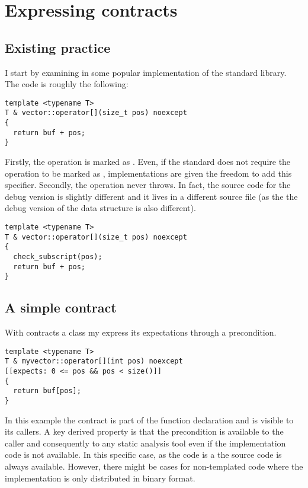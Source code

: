 \section{Expressing contracts}

\subsection{Existing practice}

I start by examining \cppid{[]} in some popular
implementation of the standard library. The code is roughly the following:

\begin{lstlisting}
template <typename T>
T & vector::operator[](size_t pos) noexcept
{
  return buf + pos;
}
\end{lstlisting}

Firstly, the operation is marked as . Even, if the standard
does not require the operation to be marked as ,
implementations are given the freedom to add this specifier. Secondly, the
operation never throws. In fact, the source code for the debug version is
slightly different and it lives in a different source file (as the the debug
version of the data structure is also different).

\begin{lstlisting}
template <typename T>
T & vector::operator[](size_t pos) noexcept
{
  check_subscript(pos);
  return buf + pos;
}
\end{lstlisting}

\subsection{A simple contract}

With contracts a class my express its expectations through a precondition.

\begin{lstlisting}
template <typename T>
T & myvector::operator[](int pos) noexcept
[[expects: 0 <= pos && pos < size()]] 
{
  return buf[pos];
}
\end{lstlisting}

In this example the contract is part of the function declaration and is visible
to its callers. A key derived property is that the precondition is available to
the caller and consequently to any static analysis tool even if the
implementation code is not available. In this specific case, as the code is a
 the source code is always available. However, there might be
cases for non-templated code where the implementation is only distributed in
binary format.

